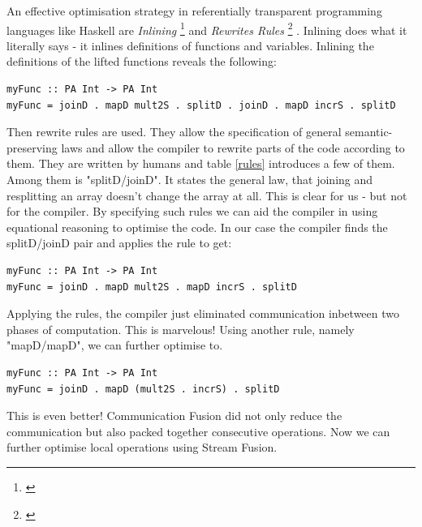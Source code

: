     An effective optimisation strategy in referentially transparent
    programming languages like Haskell are \emph{Inlining}
    \footnote{\cite{Inlining2002}}
    and \emph{Rewrites Rules}
    \footnote{\cite{Simon2001Rewrites}}
    .
    Inlining does what it literally says - it inlines definitions
    of functions and variables. Inlining the definitions
    of the lifted functions reveals the following:
    \begin{lstlisting}
myFunc :: PA Int -> PA Int
myFunc = joinD . mapD mult2S . splitD . joinD . mapD incrS . splitD
    \end{lstlisting}
    Then rewrite rules are used.
    They allow the specification of general semantic-preserving
    laws and allow the compiler to rewrite parts of the code
    according to them.
    They are written by humans and table \ref{rules} introduces a few of them.
    Among them is "splitD/joinD". It states the general law,
    that joining and resplitting an array doesn't change the array at all.
    This is clear for us - but not for the compiler. By specifying such rules
    we can aid the compiler in using equational reasoning to
    optimise the code. In our case the compiler finds the splitD/joinD pair and applies the rule to get:
    \begin{lstlisting}
myFunc :: PA Int -> PA Int
myFunc = joinD . mapD mult2S . mapD incrS . splitD
    \end{lstlisting}
    Applying the rules, the compiler just eliminated
    communication inbetween two phases of computation. This is marvelous!
    Using another rule, namely "mapD/mapD", we can further optimise to.
    \begin{lstlisting}
myFunc :: PA Int -> PA Int
myFunc = joinD . mapD (mult2S . incrS) . splitD
    \end{lstlisting}
    This is even better!
    Communication Fusion did not only reduce the communication but also
    packed together consecutive operations. Now we can further
    optimise local operations using Stream Fusion.
    
    
